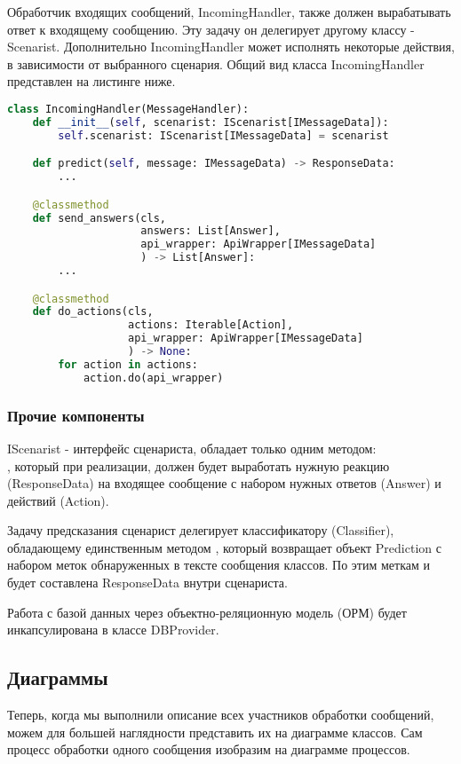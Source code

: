     Обработчик входящих сообщений, IncomingHandler, также должен вырабатывать ответ
    к входящему сообщению. Эту задачу он делегирует другому классу - Scenarist.
    Дополнительно IncomingHandler может исполнять некоторые действия,
    в зависимости от выбранного сценария.
    Общий вид класса IncomingHandler представлен на листинге ниже.
\begin{lstlisting}[language=Python]
class IncomingHandler(MessageHandler):
    def __init__(self, scenarist: IScenarist[IMessageData]):
        self.scenarist: IScenarist[IMessageData] = scenarist

    def predict(self, message: IMessageData) -> ResponseData:
        ...

    @classmethod
    def send_answers(cls,
                     answers: List[Answer],
                     api_wrapper: ApiWrapper[IMessageData]
                     ) -> List[Answer]:
        ...

    @classmethod
    def do_actions(cls,
                   actions: Iterable[Action], 
                   api_wrapper: ApiWrapper[IMessageData]
                   ) -> None:
        for action in actions:
            action.do(api_wrapper)
\end{lstlisting}

    \subsubsection*{Прочие компоненты}
    IScenarist - интерфейс сценариста, обладает только одним методом:\\
    , который при реализации, должен будет
    выработать нужную реакцию (ResponseData) на входящее сообщение с набором
    нужных ответов (Answer) и действий (Action).

    Задачу предсказания сценарист делегирует классификатору (Classifier),
    обладающему единственным методом , который
    возвращает объект Prediction с набором меток обнаруженных в тексте сообщения классов.
    По этим меткам и будет составлена ResponseData внутри сценариста.

    Работа с базой данных через объектно-реляционную модель (ОРМ) будет инкапсулирована
    в классе DBProvider.

    \subsection{Диаграммы}
    Теперь, когда мы выполнили описание всех участников обработки сообщений,
    можем для большей наглядности представить их на диаграмме классов. Сам процесс
    обработки одного сообщения изобразим на диаграмме процессов.

